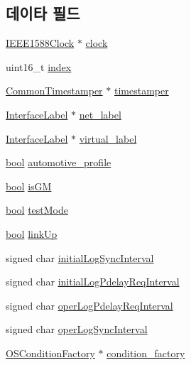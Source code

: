 \subsection*{데이타 필드}
\begin{DoxyCompactItemize}
\item 
\hyperlink{class_i_e_e_e1588_clock}{I\+E\+E\+E1588\+Clock} $\ast$ \hyperlink{struct_port_init__t_aeea9361231f8c60d763d5f74cf822f2b}{clock}
\item 
uint16\+\_\+t \hyperlink{struct_port_init__t_a852b86a2eaee9852ada7a43e61e311a2}{index}
\item 
\hyperlink{class_common_timestamper}{Common\+Timestamper} $\ast$ \hyperlink{struct_port_init__t_ae8d86c3dced7beda53b1d1e7db68c002}{timestamper}
\item 
\hyperlink{class_interface_label}{Interface\+Label} $\ast$ \hyperlink{struct_port_init__t_a5885d7a835513edd0bbb0a170b4c9f01}{net\+\_\+label}
\item 
\hyperlink{class_interface_label}{Interface\+Label} $\ast$ \hyperlink{struct_port_init__t_aedf025e9256d121930ae0efe94d45e5e}{virtual\+\_\+label}
\item 
\hyperlink{avb__gptp_8h_af6a258d8f3ee5206d682d799316314b1}{bool} \hyperlink{struct_port_init__t_a915ce34888736844c056a811c96a9e9f}{automotive\+\_\+profile}
\item 
\hyperlink{avb__gptp_8h_af6a258d8f3ee5206d682d799316314b1}{bool} \hyperlink{struct_port_init__t_ac1d89714b4aa7aa5414b44238e26d5a2}{is\+GM}
\item 
\hyperlink{avb__gptp_8h_af6a258d8f3ee5206d682d799316314b1}{bool} \hyperlink{struct_port_init__t_a4ca1649b0fc050ca483e5dd8996ac80d}{test\+Mode}
\item 
\hyperlink{avb__gptp_8h_af6a258d8f3ee5206d682d799316314b1}{bool} \hyperlink{struct_port_init__t_a3e5a0a3ec08db1c42b0f090083c8818d}{link\+Up}
\item 
signed char \hyperlink{struct_port_init__t_af64dc42272c346cc5f6f400c0e7d7088}{initial\+Log\+Sync\+Interval}
\item 
signed char \hyperlink{struct_port_init__t_a7595d62409f4880035eb20c62b64ea7c}{initial\+Log\+Pdelay\+Req\+Interval}
\item 
signed char \hyperlink{struct_port_init__t_a3062b4f36651db612ae70061510ccefb}{oper\+Log\+Pdelay\+Req\+Interval}
\item 
signed char \hyperlink{struct_port_init__t_a5b06dd259daf4e1dd5c6b8d15f9bcabf}{oper\+Log\+Sync\+Interval}
\item 
\hyperlink{class_o_s_condition_factory}{O\+S\+Condition\+Factory} $\ast$ \hyperlink{struct_port_init__t_add9d8cd27f9135b6f5ded06c01a930f2}{condition\+\_\+factory}

\end{DoxyCompactItemize}
